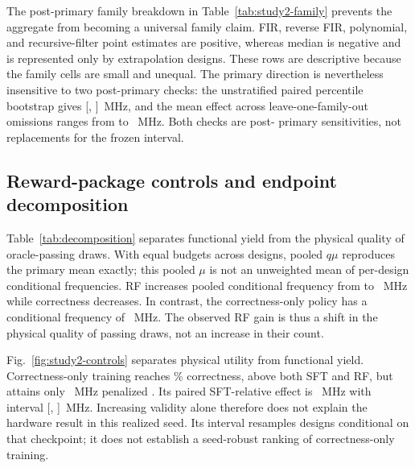 



The post-primary family breakdown in Table~\ref{tab:study2-family} prevents the aggregate from becoming a
universal family claim.  FIR, reverse FIR, polynomial, and recursive-filter
point estimates are positive, whereas median is negative and is represented
only by extrapolation designs.  These rows are descriptive because the family
cells are small and unequal.  The primary direction is nevertheless insensitive
to two post-primary checks: the unstratified paired percentile
bootstrap gives
[,
]~MHz, and the mean effect
across leave-one-family-out omissions ranges from
 to
~MHz.  Both checks are post-
primary sensitivities, not replacements for the frozen interval.

\subsection{Reward-package controls and endpoint decomposition}



Table~\ref{tab:decomposition} separates functional yield from the physical
quality of oracle-passing draws.  With equal budgets across designs, pooled
$q\mu$ reproduces the primary mean exactly; this pooled $\mu$ is not an
unweighted mean of per-design conditional frequencies.  RF increases pooled
conditional frequency from  to
~MHz while correctness decreases.  In contrast,
the correctness-only policy has a conditional frequency of
~MHz.  The observed RF gain is thus a
shift in the physical quality of passing draws, not an increase in their count.

Fig.~\ref{fig:study2-controls} separates physical utility from functional
yield.  Correctness-only training reaches
\% correctness, above both SFT
and RF, but attains only
~MHz penalized \fmax.  Its
paired SFT-relative effect is
~MHz with interval
[,
]~MHz.  Increasing validity
alone therefore does not explain the hardware result in this realized seed.
Its interval resamples designs conditional on that checkpoint; it does not
establish a seed-robust ranking of correctness-only training.

